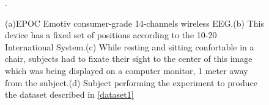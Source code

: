    
\begin{figure}[h!]
\centering
{}
\caption[EPOC Emotiv Alpha Waves Dataset]{(a)EPOC Emotiv consumer-grade 14-channels wireless EEG.(b) This device has a fixed set of positions according to the 10-20 International System.(c) While resting and sitting confortable in a chair, subjects had to fixate their sight to the center of this image which was being displayed on a computer monitor, 1 \si{meter} away from the subject.(d) Subject performing the experiment to produce the dataset described in \ref{dataset1}}.
\label{fig:alpharesults}
\end{figure}

